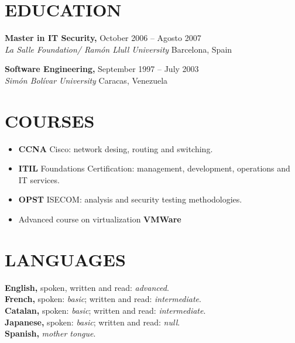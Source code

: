\documentclass[line,margin]{res}
\begin{document}
\begin{resume}
\section{EDUCATION}
               \textbf{Master in IT Security,} \hfill October 2006 -- Agosto 2007 \\
               \textit{La Salle Foundation/ Ram\'{o}n Llull University} 
               \hfill Barcelona, Spain

               \textbf{Software Engineering,} \hfill 
               September 1997 -- July 2003 \\
               \textit{Sim\'{o}n Bol\'{i}var University} \hfill Caracas, Venezuela


\section{COURSES}
               \begin{itemize}  \itemsep 2pt %
               \item \textbf{CCNA} Cisco: network desing, routing and 
               switching.
               \item \textbf{ITIL} Foundations Certification: management, 
               development, operations and IT services.
               \item \textbf{OPST} ISECOM: analysis and security testing methodologies.
               \item Advanced course on virtualization \textbf{VMWare} 
               \end{itemize}

\section{LANGUAGES} 
               \textbf{English,}
               spoken, written and read: \textit{advanced}.
               \\
               \textbf{French,}
               spoken: \textit{basic}; written and read: 
               \textit{intermediate}.
               \\
               \textbf{Catalan,}
               spoken: \textit{basic}; written and read: 
               \textit{intermediate}.
               \\
               \textbf{Japanese,}
               spoken: \textit{basic}; written and read: 
               \textit{null}.
               \\
               \textbf{Spanish,}
               \textit{mother tongue}.
               

\end{resume}
\end{document}
